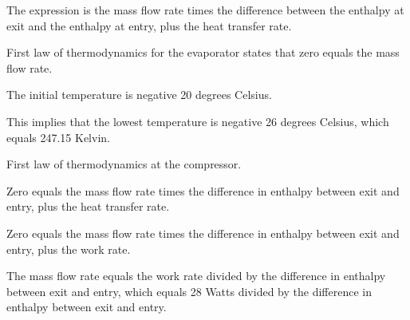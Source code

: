 The expression is the mass flow rate times the difference between the enthalpy at exit and the enthalpy at entry, plus the heat transfer rate.

First law of thermodynamics for the evaporator states that zero equals the mass flow rate.

The initial temperature is negative 20 degrees Celsius.

This implies that the lowest temperature is negative 26 degrees Celsius, which equals 247.15 Kelvin.

First law of thermodynamics at the compressor.

Zero equals the mass flow rate times the difference in enthalpy between exit and entry, plus the heat transfer rate.

Zero equals the mass flow rate times the difference in enthalpy between exit and entry, plus the work rate.

The mass flow rate equals the work rate divided by the difference in enthalpy between exit and entry, which equals 28 Watts divided by the difference in enthalpy between exit and entry.